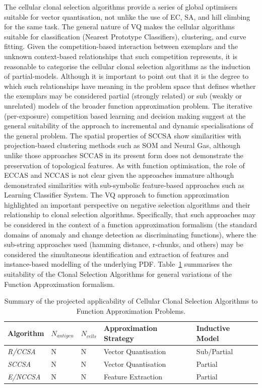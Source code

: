 The cellular clonal selection algorithms provide a series of global optimisers suitable for vector quantisation, not unlike the use of EC, SA, and hill climbing for the same task. The general nature of VQ makes the cellular algorithms suitable for classification (Nearest Prototype Classifiers), clustering, and curve fitting. Given the competition-based interaction between exemplars and the unknown context-based relationships that such competition represents, it is reasonable to categorise the cellular clonal selection algorithms as the induction of partial-models. Although it is important to point out that it is the degree to which such relationships have meaning in the problem space that defines whether the exemplars may be considered partial (strongly related) or sub (weakly or unrelated) models of the broader function approximation problem. The iterative (per-exposure) competition based learning and decision making suggest at the general suitability of the approach to incremental and dynamic specialisations of the general problem. The spatial properties of SCCSA show similarities with projection-based clustering methods such as SOM and Neural Gas, although unlike those approaches SCCAS in its present form does not demonstrate the preservation of topological features. As with function optimisation, the role of ECCAS and NCCAS is not clear given the approaches immature although demonstrated similarities with sub-symbolic feature-based approaches such as Learning Classifier System.
The VQ approach to function approximation highlighted an important perspective on negative selection algorithms and their relationship to clonal selection algorithms. Specifically, that such approaches may be considered in the context of a function approximation formalism (the standard domains of anomaly and change detection as discriminating functions), where the sub-string approaches used (hamming distance, r-chunks, and others) may be considered the simultaneous identification and extraction of features and instance-based modelling of the underlying PDF. 
Table~\ref{tab:iidle:function:approximation:cellular} summarises the suitability of the Clonal Selection Algorithms for general variations of the Function Approximation formalism.

\begin{table}[htp]
	\centering\small
		\begin{tabular}{lllll}
		\toprule
		\textbf{Algorithm} & \textbf{$N_{antigen}$} & \textbf{$N_{cells}$} & \textbf{Approximation Strategy} & \textbf{Inductive Model} \\ 
		\toprule
		\emph{R/CCSA} & N & N & Vector Quantisation & Sub/Partial \\ 
		\emph{SCCSA}  & N & N & Vector Quantisation & Partial  \\ 
		\emph{E/NCCSA}  & N & N & Feature Extraction & Partial \\
		\bottomrule
		\end{tabular}
	\caption{Summary of the projected applicability of Cellular Clonal Selection Algorithms to Function Approximation Problems.}
	\label{tab:iidle:function:approximation:cellular}
\end{table}

